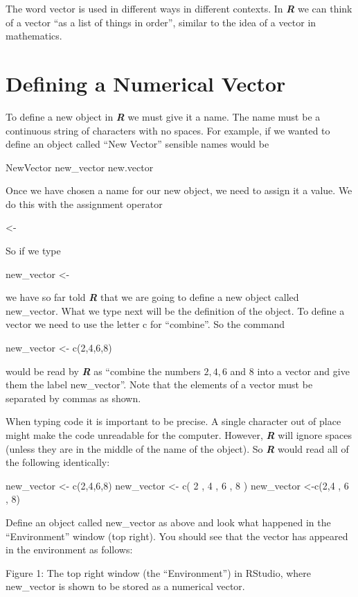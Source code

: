 \documentclass[
]{book}
\begin{document}
The word vector is used in different ways in different contexts. In \textbf{\emph{R}} we can think of a vector ``as a list of things in order'', similar to the idea of a vector in mathematics.

\section{Defining a Numerical Vector}\label{defining-a-numerical-vector}

To define a new object in \textbf{\emph{R}} we must give it a name. The name must be a continuous string of characters with no spaces. For example, if we wanted to define an object called ``New Vector'' sensible names would be

NewVector
new\_vector
new.vector

Once we have chosen a name for our new object, we need to assign it a value. We do this with the assignment operator

\textless-

So if we type

new\_vector \textless-

we have so far told \textbf{\emph{R}} that we are going to define a new object called new\_vector. What we type next will be the definition of the object. To define a vector we need to use the letter c for ``combine''. So the command

new\_vector \textless- c(2,4,6,8)

would be read by \textbf{\emph{R}} as ``combine the numbers \(2, 4, 6\) and \(8\) into a vector and give them the label new\_vector''. Note that the elements of a vector must be separated by commas as shown.

When typing code it is important to be precise. A single character out of place might make the code unreadable for the computer. However, \textbf{\emph{R}} will ignore spaces (unless they are in the middle of the name of the object). So \textbf{\emph{R}} would read all of the following identically:

new\_vector \textless- c(2,4,6,8)
new\_vector \textless- c( 2 , 4 , 6 , 8 )
new\_vector \textless-c(2,4 , 6 , 8)

Define an object called new\_vector as above and look what happened in the ``Environment'' window (top right). You should see that the vector has appeared in the environment as follows:

Figure 1: The top right window (the ``Environment'') in RStudio, where new\_vector is shown to be stored as a numerical vector.
\end{document}

